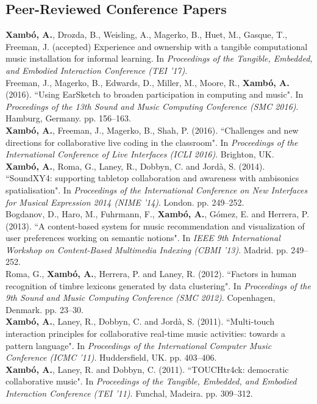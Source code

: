 \documentclass[10pt, a4paper]{article}
\newcommand{\years}[1]{\marginnote{\scriptsize #1}}
\begin{document}
\subsection*{Peer-Reviewed Conference Papers}
\noindent
\years{2017}\textbf{Xambó, A.}, Drozda, B., Weisling, A., Magerko, B., Huet, M., Gasque, T., Freeman, J. (accepted) Experience and ownership with a tangible computational music installation for informal learning. In \emph{Proceedings of the Tangible, Embedded, and Embodied Interaction Conference (TEI '17)}. \\ 
\years{2016b}Freeman, J., Magerko, B., Edwards, D., Miller, M., Moore, R., \textbf{Xambó, A.} (2016). “Using EarSketch to broaden participation in computing and music". In \emph{Proceedings of the 13th Sound and Music Computing Conference (SMC 2016)}. Hamburg, Germany. pp. 156--163.\\
\years{2016a}\textbf{Xambó, A.}, Freeman, J., Magerko, B., Shah, P. (2016). “Challenges and new directions for collaborative live coding in the classroom". In \emph{Proceedings of the International Conference of Live Interfaces (ICLI 2016)}. Brighton, UK.\\
\years{2014}\textbf{Xambó, A.}, Roma, G., Laney, R., Dobbyn, C. and Jordà, S. (2014). “SoundXY4: supporting tabletop collaboration and awareness with ambisonics spatialisation". In \emph{Proceedings of the International Conference on New Interfaces for Musical Expression 2014 (NIME '14)}. London. pp. 249--252.\\
\years{2013}Bogdanov, D., Haro, M., Fuhrmann, F., \textbf{Xambó, A.}, Gómez, E. and Herrera, P. (2013). “A content-based system for music recommendation and visualization of user preferences working on semantic notions". In \emph{IEEE 9th International Workshop on Content-Based Multimedia Indexing (CBMI '13)}. Madrid. pp. 249--252.\\
\years{2012}Roma, G., \textbf{Xambó, A.}, Herrera, P. and Laney, R. (2012). “Factors in human recognition of timbre lexicons generated by data clustering". In \emph{Proceedings of the 9th Sound and Music Computing Conference (SMC 2012)}. Copenhagen, Denmark. pp. 23--30.\\
\years{2011c}\textbf{Xambó, A.}, Laney, R., Dobbyn, C. and Jordà, S. (2011). “Multi-touch interaction principles for collaborative real-time music activities: towards a pattern language". In \emph{Proceedings of the International Computer Music Conference (ICMC '11)}. Huddersfield, UK. pp. 403--406.\\
\years{2011b}\textbf{Xambó, A.}, Laney, R. and Dobbyn, C. (2011). “TOUCHtr4ck: democratic collaborative music". In \emph{Proceedings of the Tangible, Embedded, and Embodied Interaction Conference (TEI '11)}. Funchal, Madeira. pp. 309--312.\\
\end{document}
